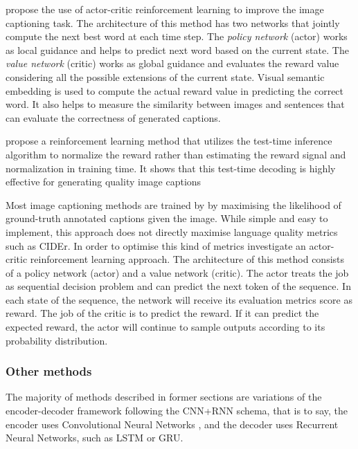 \citet{Ren2017} propose the use of actor-critic reinforcement learning \citep{Barto1983} to improve the image captioning task. The architecture of this method has two networks that jointly compute the next best word at each time step. The \textit{policy network} (actor) works as local guidance and helps to predict next word based on the current state. The \textit{value network} (critic) works as global guidance and evaluates the reward value considering all the possible extensions of the current state. Visual semantic embedding \citep{Ren2016} is used to compute the actual reward value in predicting the correct word. It also helps to measure the similarity between images and sentences that can evaluate the correctness of generated captions.

\cite{Rennie2017} propose a reinforcement learning method that utilizes the test-time inference algorithm to normalize the reward rather than estimating the reward signal and normalization in training time. It shows that this test-time decoding is highly effective for generating quality image captions

Most image captioning methods are trained by by maximising the likelihood of ground-truth annotated captions given the image. While simple and easy to implement, this approach does not directly maximise language quality metrics such as CIDEr. In order to optimise this kind of metrics \cite{Zhang2017} investigate an actor-critic reinforcement learning \citep{Barto1983} approach. The architecture of this method consists of a policy network (actor) and a value network (critic). The actor treats the job as sequential decision problem and can predict the next token of the sequence. In each state of the sequence, the network will receive its evaluation metrics score as reward. The job of the critic is to predict the reward. If it can predict the expected reward, the actor will continue to sample outputs according to its probability distribution. 

\subsubsection{Other methods}

The majority of methods described in former sections are variations of the encoder-decoder framework following the CNN+RNN schema, that is to say, the encoder uses Convolutional Neural Networks \cite{Lecun1998}, and the decoder uses Recurrent Neural Networks, such as LSTM\citep{Hochreiter1997} or GRU\citep{Chung2014}.

